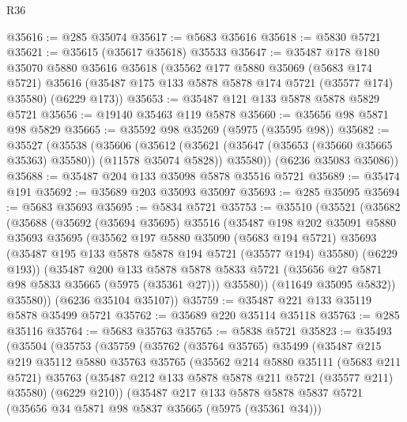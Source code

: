 \begin{lexlean}{R36}
\begin{coremodule}
@35616 := @285 @35074
@35617 := @5683 @35616
@35618 := @5830 @5721
@35621 := @35615 (@35617 @35618) @35533
@35647 := @35487
    @178
    @180
    @35070
    @5880
    @35616
    @35618
    (@35562
      @177
      @5880
      @35069
      (@5683 @174 @5721)
      @35616
      (@35487 @175 @133 @5878 @5878 @174 @5721 (@35577 @174) @35580)
      (@6229 @173))
@35653 := @35487 @121 @133 @5878 @5878 @5829 @5721
@35656 := @19140 @35463 @119 @5878
@35660 := @35656 @98 @5871 @98 @5829
@35665 := @35592 @98 @35269 (@5975 (@35595 @98))
@35682 := @35527
    (@35538
      (@35606
        (@35612
          (@35621 (@35647 (@35653 (@35660 @35665 @35363) @35580)) (@11578 @35074 @5828))
          @35580))
      (@6236 @35083 @35086))
@35688 := @35487 @204 @133 @35098 @5878 @35516 @5721
@35689 := @35474 @191
@35692 := @35689 @203 @35093 @35097
@35693 := @285 @35095
@35694 := @5683 @35693
@35695 := @5834 @5721
@35753 := @35510
    (@35521
      (@35682
        (@35688
          (@35692
            (@35694 @35695)
            @35516
            (@35487
              @198
              @202
              @35091
              @5880
              @35693
              @35695
              (@35562
                @197
                @5880
                @35090
                (@5683 @194 @5721)
                @35693
                (@35487 @195 @133 @5878 @5878 @194 @5721 (@35577 @194) @35580)
                (@6229 @193))
              (@35487
                @200
                @133
                @5878
                @5878
                @5833
                @5721
                (@35656 @27 @5871 @98 @5833 @35665 (@5975 (@35361 @27)))
                @35580))
            (@11649 @35095 @5832))
          @35580))
      (@6236 @35104 @35107))
@35759 := @35487 @221 @133 @35119 @5878 @35499 @5721
@35762 := @35689 @220 @35114 @35118
@35763 := @285 @35116
@35764 := @5683 @35763
@35765 := @5838 @5721
@35823 := @35493
    (@35504
      (@35753
        (@35759
          (@35762
            (@35764 @35765)
            @35499
            (@35487
              @215
              @219
              @35112
              @5880
              @35763
              @35765
              (@35562
                @214
                @5880
                @35111
                (@5683 @211 @5721)
                @35763
                (@35487 @212 @133 @5878 @5878 @211 @5721 (@35577 @211) @35580)
                (@6229 @210))
              (@35487
                @217
                @133
                @5878
                @5878
                @5837
                @5721
                (@35656 @34 @5871 @98 @5837 @35665 (@5975 (@35361 @34)))

\end{coremodule}
\end{lexlean}
